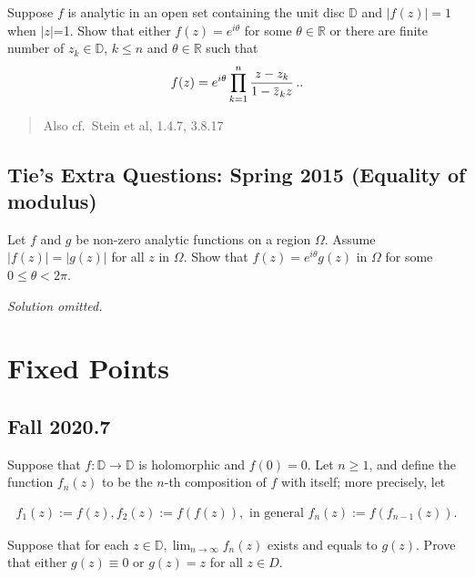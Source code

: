 \begin{problem}[?]

Suppose \(f\) is analytic in an open set containing the unit disc
\(\mathbb D\) and \(|f(z)| =1\) when \(|z|\)=1. Show that either
\(f(z) = e^{i \theta}\) for some \(\theta \in \mathbb R\) or there are
finite number of \(z_k \in \mathbb D\), \(k \leq n\) and
\(\theta \in \mathbb R\) such that
\begin{align*}
\displaystyle f(z) = e^{i\theta} \prod_{k=1}^n \frac{z-z_k}{1 - \mkern 1.5mu\overline{\mkern-1.5muz\mkern-1.5mu}\mkern 1.5mu_k z } \, .
.\end{align*}

\begin{quote}
Also cf.~Stein et al, 1.4.7, 3.8.17
\end{quote}

\end{problem}

\hypertarget{ties-extra-questions-spring-2015-equality-of-modulus}{%
\subsection{Tie's Extra Questions: Spring 2015 (Equality of
modulus)}\label{ties-extra-questions-spring-2015-equality-of-modulus}}

\begin{problem}[?]

Let \(f\) and \(g\) be non-zero analytic functions on a region
\(\Omega\). Assume \(|f(z)| = |g(z)|\) for all \(z\) in \(\Omega\). Show
that \(f(z) = e^{i \theta} g(z)\) in \(\Omega\) for some
\(0 \leq \theta < 2 \pi\).

\end{problem}

\emph{Solution omitted.}

\hypertarget{fixed-points-1}{%
\section{Fixed Points}\label{fixed-points-1}}

\hypertarget{fall-2020.7}{%
\subsection{Fall 2020.7}\label{fall-2020.7}}

\begin{problem}[?]

Suppose that \(f: \mathbb{D} \rightarrow \mathbb{D}\) is holomorphic and
\(f(0)=0\). Let \(n \geq 1\), and define the function \(f_{n}(z)\) to be
the \(n\)-th composition of \(f\) with itself; more precisely, let

\begin{align*}
f_{1}(z):=f(z), f_{2}(z):=f(f(z)), \text { in general } f_{n}(z):=f\left(f_{n-1}(z)\right) .
\end{align*}

Suppose that for each
\(z \in \mathbb{D}, \lim _{n \rightarrow \infty} f_{n}(z)\) exists and
equals to \(g(z)\). Prove that either \(g(z) \equiv 0\) or \(g(z)=z\)
for all \(z \in D\).

\end{problem}

